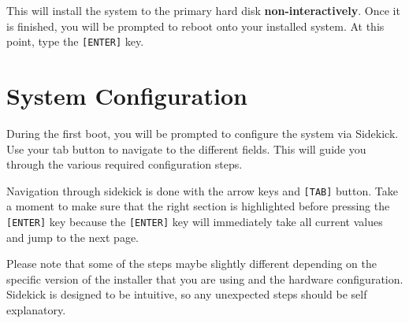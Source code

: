 \documentclass[10pt,letterpaper]{article}
\begin{document}
This will install the system to the primary hard disk {\bf non-interactively}.
Once it is finished, you will be prompted to reboot onto your installed
system. At this point, type the {\tt [ENTER]} key.

\section{System Configuration}
During the first boot, you will be prompted to configure the system via
Sidekick. Use your tab button to navigate to the different fields. This
will guide you through the various required configuration steps.

Navigation through sidekick is done with the arrow keys and {\tt [TAB]}
button. Take a moment to make sure that the right section is highlighted
before pressing the {\tt [ENTER]} key because the {\tt [ENTER]} key will
immediately take all current values and jump to the next page.

Please note that some of the steps maybe slightly different depending on the
specific version of the installer that you are using and the hardware
configuration. Sidekick is designed to be intuitive, so any unexpected steps
should be self explanatory.
\end{document}
